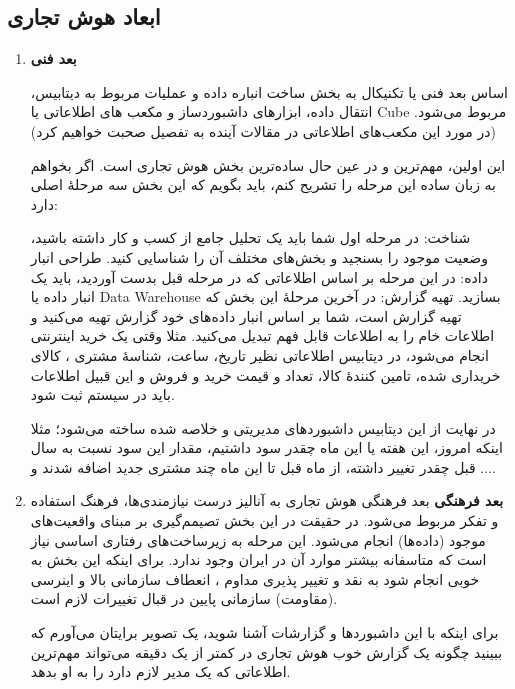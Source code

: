 \documentclass{llncs}
\begin{document}
\subsection{ابعاد هوش تجاری}
\begin{enumerate}
\item \textbf{بعد فنی}
\newline

اساس بعد فنی یا تکنیکال به بخش ساخت انباره داده و عملیات مربوط به دیتابیس، انتقال داده، ابزارهای داشبوردساز و مکعب های اطلاعاتی یا Cube مربوط می‌شود. (در مورد این مکعب‌های اطلاعاتی در مقالات آینده به تفصیل صحبت خواهیم کرد)

این اولین، مهم‌ترین و در عین حال ساده‌ترین بخش هوش تجاری است. اگر بخواهم به زبان ساده این مرحله را تشریح کنم، باید بگویم که این بخش سه مرحلۀ اصلی دارد:

شناخت: در مرحله اول شما باید یک تحلیل جامع از کسب و کار داشته باشید، وضعیت موجود را بسنجید و بخش‌های مختلف آن را شناسایی کنید.
طراحی انبار داده: در این مرحله بر اساس اطلاعاتی که در مرحله قبل بدست آوردید، باید یک انبار داده یا Data Warehouse بسازید.
تهیه گزارش: در آخرین مرحلۀ این بخش که تهیه گزارش است، شما بر اساس انبار داده‌های خود گزارش تهیه می‌کنید و اطلاعات خام را به اطلاعات قابل فهم تبدیل می‌کنید.
مثلا وقتی یک خرید اینترنتی انجام می‌شود، در دیتابیس اطلاعاتی نظیر تاریخ، ساعت، شناسۀ مشتری ، کالای خریداری شده، تامین کنندۀ کالا، تعداد و قیمت خرید و فروش و این قبیل اطلاعات باید در سیستم ثبت شود.

در نهایت از این دیتابیس داشبوردهای مدیریتی و خلاصه شده ساخته می‌شود؛ مثلا اینکه امروز، این هفته یا این ماه چقدر سود داشتیم، مقدار این سود نسبت به سال قبل چقدر تغییر داشته، از ماه قبل تا این ماه چند مشتری جدید اضافه شدند و ....

\item \textbf{بعد فرهنگی}
\newline
بعد فرهنگی هوش تجاری به آنالیز درست نیازمندی‌ها، فرهنگ استفاده و تفکر مربوط می‌شود. در حقیقت در این بخش تصیمم‌گیری بر مبنای واقعیت‌های موجود (داده‌ها) انجام می‌شود. این مرحله به زیرساخت‌های رفتاری اساسی نیاز است که متاسفانه بیشتر موارد آن در ایران وجود ندارد. برای اینکه این بخش به خوبی انجام شود به نقد و تغییر پذیری مداوم ، انعطاف سازمانی بالا و اینرسی (مقاومت) سازمانی پایین در قبال تغییرات لازم است.

برای اینکه با این داشبوردها و گزارشات آشنا شوید، یک تصویر برایتان می‌آورم که ببینید چگونه یک گزارش خوب هوش تجاری در کمتر از یک دقیقه می‌تواند مهم‌ترین اطلاعاتی که یک مدیر لازم دارد را به او بدهد.

\end{enumerate}
\end{document}
